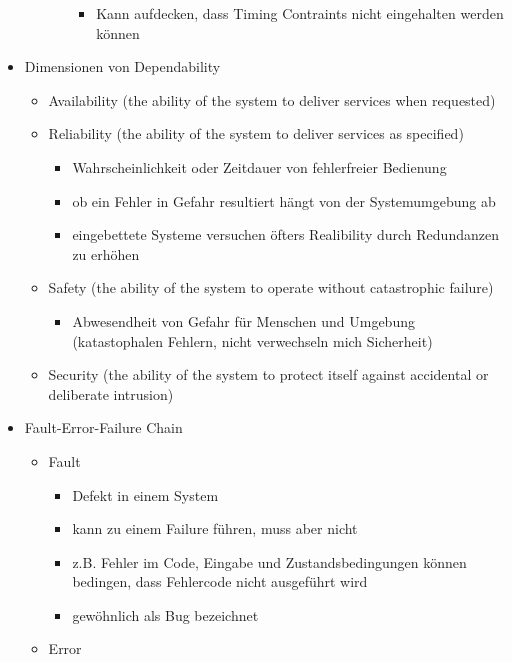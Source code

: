 \documentclass[paper=a4, fontsize=11pt]{scrartcl} %
\numberwithin{equation}{section} %
\numberwithin{figure}{section} %
\numberwithin{table}{section} %
\begin{document}
\begin{itemize}
\begin{itemize}
\begin{itemize}
\begin{itemize}
        \item Kann aufdecken, dass Timing Contraints nicht eingehalten werden können
      \end{itemize}
    \end{itemize}
  \end{itemize}
  \item Dimensionen von Dependability
  \begin{itemize}
    \item Availability (the ability of the system to deliver services when requested)
    \item Reliability (the ability of the system to deliver services as specified)
    \begin{itemize}
      \item Wahrscheinlichkeit oder Zeitdauer von fehlerfreier Bedienung
      \item ob ein Fehler in Gefahr resultiert hängt von der Systemumgebung ab
      \item eingebettete Systeme versuchen öfters Realibility durch Redundanzen zu erhöhen
    \end{itemize}
    \item Safety (the ability of the system to operate without catastrophic failure)
    \begin{itemize}
      \item Abwesendheit von Gefahr für Menschen und Umgebung (katastophalen Fehlern, nicht verwechseln mich Sicherheit)
    \end{itemize}
    \item Security (the ability of the system to protect itself against accidental or deliberate intrusion)
  \end{itemize}
  \item Fault-Error-Failure Chain
  \begin{itemize}
    \item Fault
    \begin{itemize}
      \item Defekt in einem System
      \item kann zu einem Failure führen, muss aber nicht
      \item z.B. Fehler im Code, Eingabe und Zustandsbedingungen können bedingen, dass Fehlercode nicht ausgeführt wird
      \item gewöhnlich als Bug bezeichnet
    \end{itemize}
    \item Error
    \begin{itemize}

\end{itemize}
\end{itemize}
\end{itemize}
\end{document}
